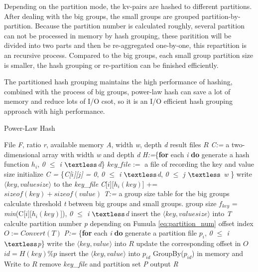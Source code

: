 Depending on the partition mode, the kv-pairs are hashed to different partitions. After dealing with the big groups, the small groups are grouped partition-by-partition. Because the partition number is calculated roughly, several partition can not be processed in memory by hash grouping, these paritition will be divided into two parts and then be re-aggregated one-by-one, this repartition is an recursive process. Compared to the big groups, each small group partition size is smaller, the hash grouping or re-partition can be finished efficiently.

The partitioned hash grouping maintains the high performance of hashing, combined with the process of big groups, power-law hash can save a lot of memory and reduce lots of I/O csot, so it is an I/O efficient hash grouping approach with high performance.  
\begin{algorithm}[ht]
    \caption{Power-Law Hash}
  \label{alg:group}
    \begin{algorithmic}[1]
    \Require  File \emph{F}, ratio \emph{r}, available memory \emph{A}, width \emph{w}, depth \emph{d}
    \Ensure result files $R$
    \State \emph{C:=} a two-dimensional array with width \emph{w} and depth \emph{d}
    \State \emph{H:=}\{\textbf{for} each \emph{i} \textbf{do} generate a hash function $h_i$, \emph{0 $\le$ i $\textless$d}\}    
    \State $key\_file :=$ a file of recording the key and value size
    \State initialize \emph{C = } \{\emph{C[$i$][$j$] = 0}, \emph{0 $\le$ i $\textless$d}, \emph{0 $\le$ j $\textless$ w} \}
    	\State write $\langle key,valuesize\rangle$ to the \emph{key\_file}
          \State \emph{C}[$i$][$h_{i}(key)$] += $sizeof(key) + sizeof(value)$
        \EndFor  
    \EndFor
    \State \emph{T:=} a group size table for the big groups
    \State calculate threshold \emph{t} between big groups and small groups.
    	\State group size $f_{key}$ = \emph{min}(C[$i$][$h_{i}(key)$]), \emph{0 $\le$ i $\textless$d}
    		\State insert the $\langle key,valuesize\rangle$ into \emph{T}    
    	\EndIf    	
    \EndFor
    \State calculte partition number \emph{p} depending on Fumula \ref{eq:partition_num}
    \State offset index $O:=Convert(T)$
    \State \emph{P:=} \{\textbf{for} each \emph{i} \textbf{do} generate a partition file $p_i$, \emph{0 $\le$ i $\textless$p}\}
    		\State write the $\langle key,value\rangle$ into $R$
    		\State update the corresponding offset in $O$
    	\Else 
    		\State $id = H(key) \% p$
    		\State insert the $\langle key,value\rangle$ into $p_{id}$ 
    	\EndIf
    \EndFor
		\State GroupBy($p_{id}$) in memory and Write to $R$
    \EndFor
    \State remove \emph{key\_file} and partition set \emph{P}
    \State output \emph{R}
    \end{algorithmic}
\end{algorithm}

